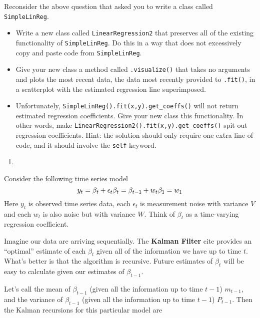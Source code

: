 \documentclass[12pt,krantz2]{krantz}
\providecommand{\tightlist}{%
  \setlength{\itemsep}{0pt}\setlength{\parskip}{0pt}}
\begin{document}
Reconsider the above question that asked you to write a class called \texttt{SimpleLinReg}.

\begin{itemize}
\tightlist
\item
  Write a new class called \texttt{LinearRegression2} that preserves all of the existing functionality of \texttt{SimpleLinReg}. Do this in a way that does not excessively copy and paste code from \texttt{SimpleLinReg}.
\item
  Give your new class a method called \texttt{.visualize()} that takes no arguments and plots the most recent data, the data most recently provided to \texttt{.fit()}, in a scatterplot with the estimated regression line superimposed.
\item
  Unfortunately, \texttt{SimpleLinReg().fit(x,y).get\_coeffs()} will not return estimated regression coefficients. Give your new class this functionality. In other words, make \texttt{LinearRegression2().fit(x,y).get\_coeffs()} spit out regression coefficients. Hint: the solution should only require one extra line of code, and it should involve the \texttt{self} keyword.
\end{itemize}

\begin{enumerate}
\def\labelenumi{\arabic{enumi}.}
\setcounter{enumi}{2}
\item
\end{enumerate}

Consider the following time series model \citep{West1989BayesianFA}
\begin{equation} 
y_t = \beta_t + \epsilon_t \\
\beta_t = \beta_{t-1} + w_t \\
\beta_1 = w_1
\end{equation}
Here \(y_t\) is observed time series data, each \(\epsilon_t\) is measurement noise with variance \(V\) and each \(w_t\) is also noise but with variance \(W\). Think of \(\beta_t\) as a time-varying regression coefficient.

Imagine our data are arriving sequentially. The \textbf{Kalman Filter} \citep{kalman_filt} cite provides an ``optimal'' estimate of each \(\beta_t\) given all of the information we have up to time \(t\). What's better is that the algorithm is recursive. Future estimates of \(\beta_t\) will be easy to calculate given our estimates of \(\beta_{t-1}\).

Let's call the mean of \(\beta_{t-1}\) (given all the information up to time \(t-1\)) \(m_{t-1}\), and the variance of \(\beta_{t-1}\) (given all the information up to time \(t-1\)) \(P_{t-1}\). Then the Kalman recursions for this particular model are
\end{document}
